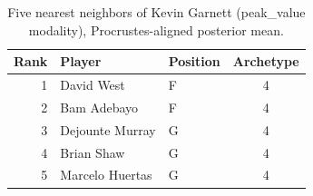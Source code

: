 \begin{table}[htbp]
  \centering\small
  \begin{tabular}{rllc}
    \toprule
    Rank & Player & Position & Archetype \\
    \midrule
    1 & David West & F & 4 \\
    2 & Bam Adebayo & F & 4 \\
    3 & Dejounte Murray & G & 4 \\
    4 & Brian Shaw & G & 4 \\
    5 & Marcelo Huertas & G & 4 \\
    \bottomrule
  \end{tabular}
  \caption{Five nearest neighbors of Kevin Garnett (peak_value modality), Procrustes-aligned posterior mean.}
  \label{tab:Kevin_Garnett_neighbors_peak_value}
\end{table}

